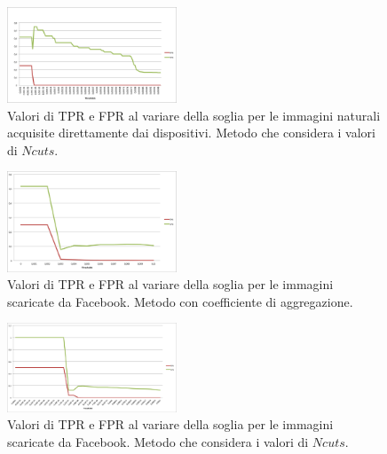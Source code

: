 \begin{figure}[h]
\begin{center}
\includegraphics[width=0.45\textwidth]{images/soglia_imgnat_NC.png}
\end{center}
  \caption{Valori di TPR e FPR al variare della soglia per le immagini naturali acquisite direttamente dai dispositivi. Metodo che considera i valori di $Ncuts$.}
\label{fig:soglia AC}
\end{figure}

\begin{figure}[h]
\begin{center}
\includegraphics[width=0.45\textwidth]{images/soglia_imgnat_fb_AC.png}
\end{center}
  \caption{Valori di TPR e FPR al variare della soglia per le immagini scaricate da Facebook. Metodo con coefficiente di aggregazione.}
\label{fig:soglia AC}
\end{figure}

\begin{figure}[h]
\begin{center}
\includegraphics[width=0.45\textwidth]{images/soglia_imgnat_fb_NC.png}
\end{center}
  \caption{Valori di TPR e FPR al variare della soglia per le immagini scaricate da Facebook. Metodo che considera i valori di $Ncuts$.}
\label{fig:soglia AC}
\end{figure}

